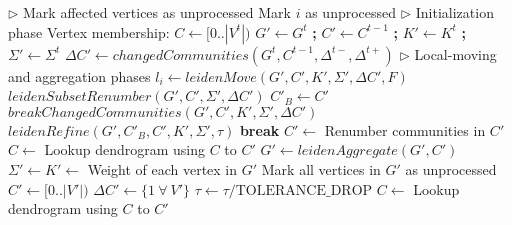 \begin{algorithm}[hbtp]
\begin{algorithmic}[1]
 \label{alg:leiden--begin}
  \State $\rhd$ Mark affected vertices as unprocessed
   \label{alg:leiden--mark-begin}
     Mark $i$ as unprocessed
    \EndIf
  \EndFor \label{alg:leiden--mark-end}
  \State $\rhd$ Initialization phase
  \State Vertex membership: $C \gets [0 .. |V^t|)$ \label{alg:leiden--init-begin}
  \State $G' \gets G^t$ \textbf{;} $C' \gets C^{t-1}$ \textbf{;} $K' \gets K^t$ \textbf{;} $\Sigma' \gets \Sigma^t$
  \State $\Delta C' \gets changedCommunities(G^t, C^{t-1}, \Delta^{t-}, \Delta^{t+})$ \label{alg:leiden--init-end}
  \State $\rhd$ Local-moving and aggregation phases
  \ForAll{$l_p \in [0 .. \text{MAX\_PASSES})$} \label{alg:leiden--passes-begin}
    \State $l_i \gets leidenMove(G', C', K', \Sigma', \Delta C', F)$  \label{alg:leiden--local-move}
    \State $leidenSubsetRenumber(G', C', \Sigma', \Delta C')$  \label{alg:leiden-subset-renumber}
    \State $C'_B \gets C'$ 
    \State $breakChangedCommunities(G', C', K', \Sigma', \Delta C')$ \label{alg:leiden--reset-again}
    \State $leidenRefine(G', C'_B, C', K', \Sigma', \tau)$  \label{alg:leiden--refine}
     \textbf{break}  \label{alg:leiden--globally-converged}
    \EndIf
    \State $C' \gets$ Renumber communities in $C'$ \label{alg:leiden--renumber}
    \State $C \gets$ Lookup dendrogram using $C$ to $C'$ \label{alg:leiden--lookup}
    \State $G' \gets leidenAggregate(G', C')$  \label{alg:leiden--aggregate}
    \State $\Sigma' \gets K' \gets$ Weight of each vertex in $G'$ \label{alg:leiden--reset-weights}
    \State Mark all vertices in $G'$ as unprocessed \label{alg:leiden--reset-affected}
    \State $C' \gets [0 .. |V'|)$  \label{alg:leiden--useparent}
    \State $\Delta C' \gets \{1\ \forall\ V'\}$  \label{alg:leiden--all-communities-changed}
    \State $\tau \gets \tau / \text{TOLERANCE\_DROP}$  \label{alg:leiden--threshold-scaling}
  \EndFor \label{alg:leiden--passes-end}
  \State $C \gets$ Lookup dendrogram using $C$ to $C'$ \label{alg:leiden--lookup-last}
   \label{alg:leiden--return}
\EndFunction \label{alg:leiden--end}


\end{algorithmic}
\end{algorithm}
